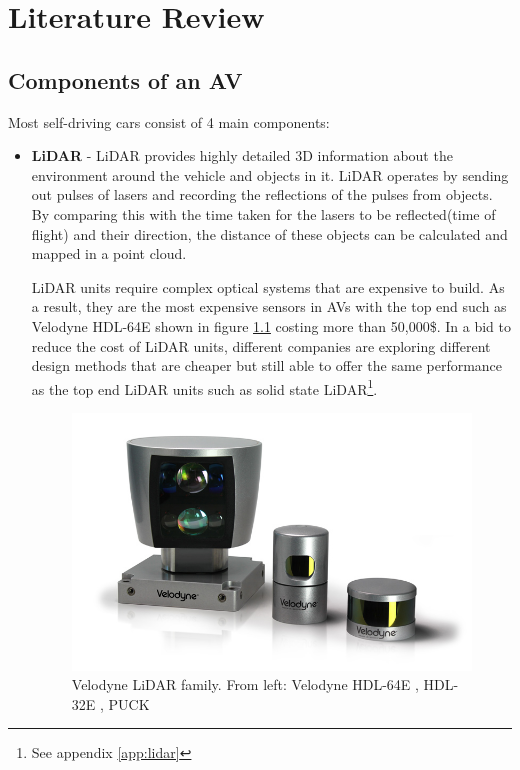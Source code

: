 \let\textcircled=\pgftextcircled


\chapter{Literature Review}
\label{chap:lit_review}


\section{Components of an AV}

Most self-driving cars consist of 4 main components: 
\begin{itemize}
	\item \textbf{LiDAR} - LiDAR provides highly detailed 3D information about the environment around the vehicle and objects in it. LiDAR operates by sending out pulses of lasers and recording the reflections of the pulses from objects. By comparing this with the time taken for the lasers to be reflected(time of flight) and their direction, the distance of these objects can be calculated and mapped in a point cloud. 

	LiDAR units require complex optical systems that are expensive to build. As a result,  they are the most expensive sensors in AVs with the top end such as Velodyne HDL-64E shown in figure \ref{fig:lidar} costing more than 50,000\$. 
	In a bid to reduce the cost of LiDAR units,  different companies are exploring different design methods that are cheaper but still able to offer the same performance as the top end LiDAR units such as solid state LiDAR\footnote{See appendix \ref{app:lidar}}.
	
	 \begin{figure}[h]
	 	\centering
	 	\includegraphics[width=\textwidth]{media/hdl-family.png}
	 	\caption{Velodyne LiDAR family. From left: Velodyne HDL-64E , HDL-32E , PUCK}
	 	\label{fig:lidar}
	 \end{figure}
	

\end{itemize}
